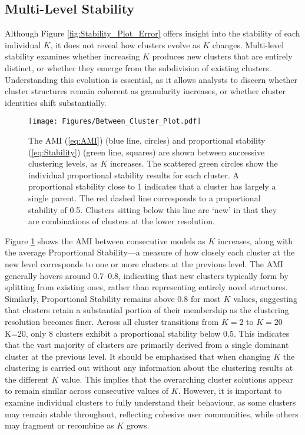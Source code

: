 \documentclass{article}
\begin{document}
\subsection*{Multi-Level Stability}
Although Figure \ref{fig:Stability_Plot_Error} offers insight into the stability of each individual $K$, it does not reveal how clusters evolve as $K$ changes. Multi-level stability examines whether increasing $K$ produces new clusters that are entirely distinct, or whether they emerge from the subdivision of existing clusters. Understanding this evolution is essential, as it allows analysts to discern whether cluster structures remain coherent as granularity increases, or whether cluster identities shift substantially.


\begin{figure}[htbp]
 \begin{flushleft}
  \texttt{[image: Figures/Between\_Cluster\_Plot.pdf]}
  \caption[Proportional Stability]{
   The AMI (\ref{eq:AMI}) (blue line, circles) and proportional stability (\ref{eq:Stability}) (green line, squares) are shown between successive clustering levels, as $K$ increases.  The scattered green circles show the individual proportional stability results for each cluster.  A proportional stability close to 1 indicates that a cluster has largely a single parent.  The red dashed line corresponds to a proportional stability of 0.5.  Clusters sitting below this line are `new' in that they are combinations of clusters at the lower resolution.}
  \label{fig:Between Clusters}
  \end{flushleft}
\end{figure}

Figure \ref{fig:Between Clusters} shows the AMI between consecutive models as $K$ increases, along with the average Proportional Stability—a measure of how closely each cluster at the new level corresponds to one or more clusters at the previous level. The AMI generally hovers around 0.7–0.8, indicating that new clusters typically form by splitting from existing ones, rather than representing entirely novel structures. Similarly, Proportional Stability remains above 0.8 for most $K$ values, suggesting that clusters retain a substantial portion of their membership as the clustering resolution becomes finer. Across all cluster transitions from $K= 2$ to $K= 20$
K=20, only 8 clusters exhibit a proportional stability below 0.5. This indicates that the vast majority of clusters are primarily derived from a single dominant cluster at the previous level.
It should be emphasised that when changing $K$ the clustering is carried out without any information about the clustering results at the different $K$ value.  This implies that the overarching cluster solutions appear to remain similar across consecutive values of $K$. However, it is important to examine individual clusters to fully understand their behaviour, as some clusters may remain stable throughout, reflecting cohesive user communities, while others may fragment or recombine as $K$ grows.
\end{document}

